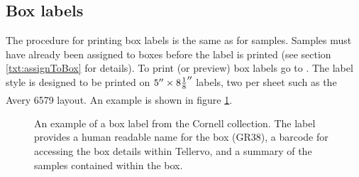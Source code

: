 \subsection{Box labels}
The procedure for printing box labels is the same as for samples.  Samples must have already been assigned to boxes before the label is printed (see section \ref{txt:assignToBox} for details).  To print (or preview) box labels go to .  The label style is designed to be printed on $5'' \times 8{1 \over 8}''$ labels, two per sheet such as the Avery\textsuperscript{\textregistered} 6579 layout.  An example is shown in figure \ref{fig:boxlabel}.

\begin{figure}[htbp]
  \centering
    \setlength\fboxsep{0pt}
    \setlength\fboxrule{0.5pt}
    \caption{An example of a box label from the Cornell collection. The label provides a human readable name for the box (GR38), a barcode for accessing the box details within Tellervo, and a summary of the samples contained within the box.}
    \label{fig:boxlabel}
\end{figure}

